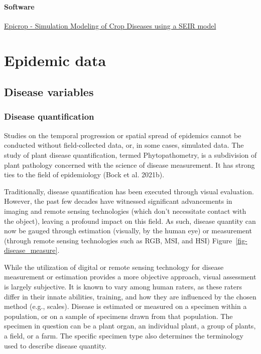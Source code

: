 \documentclass[
  letterpaper,
  DIV=11,
  numbers=noendperiod]{scrreprt}
\begin{document}
\hypertarget{software}{%
\subsection{Software}\label{software}}

\href{http://adamhsparks.github.io/epicrop/}{Epicrop - Simulation
Modeling of Crop Diseases using a SEIR model}

\part{Epidemic data}

\hypertarget{disease-variables}{%
\chapter{Disease variables}\label{disease-variables}}

\hypertarget{disease-quantification}{%
\section{Disease quantification}\label{disease-quantification}}

Studies on the temporal progression or spatial spread of epidemics
cannot be conducted without field-collected data, or, in some cases,
simulated data. The study of plant disease quantification, termed
Phytopathometry, is a subdivision of plant pathology concerned with the
science of disease measurement. It has strong ties to the field of
epidemiology (Bock et al. 2021b).

Traditionally, disease quantification has been executed through visual
evaluation. However, the past few decades have witnessed significant
advancements in imaging and remote sensing technologies (which don't
necessitate contact with the object), leaving a profound impact on this
field. As such, disease quantity can now be gauged through estimation
(visually, by the human eye) or measurement (through remote sensing
technologies such as RGB, MSI, and HSI)
Figure~\ref{fig-disease_measure}.

While the utilization of digital or remote sensing technology for
disease measurement or estimation provides a more objective approach,
visual assessment is largely subjective. It is known to vary among human
raters, as these raters differ in their innate abilities, training, and
how they are influenced by the chosen method (e.g., scales). Disease is
estimated or measured on a specimen within a population, or on a sample
of specimens drawn from that population. The specimen in question can be
a plant organ, an individual plant, a group of plants, a field, or a
farm. The specific specimen type also determines the terminology used to
describe disease quantity.
\end{document}
